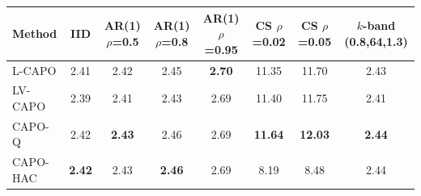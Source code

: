 \begin{tabular}{lccccccc}
\toprule
Method & IID & AR(1) $\rho$=0.5 & AR(1) $\rho$=0.8 & AR(1) $\rho$=0.95 & CS $\rho$=0.02 & CS $\rho$=0.05 & $k$-band (0.8,64,1.3) \\
\midrule
L-CAPO & 2.41 & 2.42 & 2.45 & \textbf{2.70} & 11.35 & 11.70 & 2.43 \\
LV-CAPO & 2.39 & 2.41 & 2.43 & 2.69 & 11.40 & 11.75 & 2.41 \\
CAPO-Q & 2.42 & \textbf{2.43} & 2.46 & 2.69 & \textbf{11.64} & \textbf{12.03} & \textbf{2.44} \\
CAPO-HAC & \textbf{2.42} & 2.43 & \textbf{2.46} & 2.69 & 8.19 & 8.48 & 2.44 \\
\bottomrule
\end{tabular}
